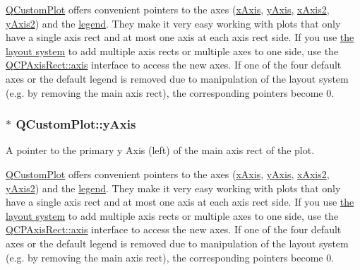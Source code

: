 \hyperlink{classQCustomPlot}{Q\+Custom\+Plot} offers convenient pointers to the axes (\hyperlink{classQCustomPlot_a9a79cd0158a4c7f30cbc702f0fd800e4}{x\+Axis}, \hyperlink{classQCustomPlot_af6fea5679725b152c14facd920b19367}{y\+Axis}, \hyperlink{classQCustomPlot_ada41599f22cad901c030f3dcbdd82fd9}{x\+Axis2}, \hyperlink{classQCustomPlot_af13fdc5bce7d0fabd640f13ba805c0b7}{y\+Axis2}) and the \hyperlink{classQCustomPlot_a4eadcd237dc6a09938b68b16877fa6af}{legend}. They make it very easy working with plots that only have a single axis rect and at most one axis at each axis rect side. If you use \hyperlink{}{the layout system} to add multiple axis rects or multiple axes to one side, use the \hyperlink{classQCPAxisRect_a560de44e47a4af0f86c59102a094b1e4}{Q\+C\+P\+Axis\+Rect\+::axis} interface to access the new axes. If one of the four default axes or the default legend is removed due to manipulation of the layout system (e.\+g. by removing the main axis rect), the corresponding pointers become 0. \hypertarget{classQCustomPlot_af6fea5679725b152c14facd920b19367}{}
\subsubsection[{y\+Axis}]{ $\ast$ Q\+Custom\+Plot\+::y\+Axis}\label{classQCustomPlot_af6fea5679725b152c14facd920b19367}


A pointer to the primary y Axis (left) of the main axis rect of the plot. 

\hyperlink{classQCustomPlot}{Q\+Custom\+Plot} offers convenient pointers to the axes (\hyperlink{classQCustomPlot_a9a79cd0158a4c7f30cbc702f0fd800e4}{x\+Axis}, \hyperlink{classQCustomPlot_af6fea5679725b152c14facd920b19367}{y\+Axis}, \hyperlink{classQCustomPlot_ada41599f22cad901c030f3dcbdd82fd9}{x\+Axis2}, \hyperlink{classQCustomPlot_af13fdc5bce7d0fabd640f13ba805c0b7}{y\+Axis2}) and the \hyperlink{classQCustomPlot_a4eadcd237dc6a09938b68b16877fa6af}{legend}. They make it very easy working with plots that only have a single axis rect and at most one axis at each axis rect side. If you use \hyperlink{}{the layout system} to add multiple axis rects or multiple axes to one side, use the \hyperlink{classQCPAxisRect_a560de44e47a4af0f86c59102a094b1e4}{Q\+C\+P\+Axis\+Rect\+::axis} interface to access the new axes. If one of the four default axes or the default legend is removed due to manipulation of the layout system (e.\+g. by removing the main axis rect), the corresponding pointers become 0. \hypertarget{classQCustomPlot_af13fdc5bce7d0fabd640f13ba805c0b7}{}
